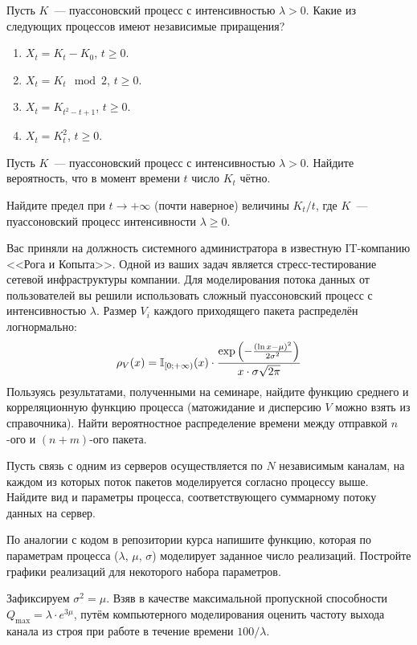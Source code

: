 \documentclass[12pt]{article}
\def\practice{\textbf{(практическое задание)}}
\begin{document}
\begin{exercise}
    Пусть $ K $~--- пуассоновский процесс с интенсивностью $ \lambda > 0 $.
    Какие из следующих процессов имеют независимые приращения?
    \begin{enumerate}
        \item $ X_t = K_t - K_0 $, $ t \geqslant 0 $.
        \item $ X_t = K_t \mod 2 $, $ t \geqslant 0 $.
        \item $ X_t = K_{t^2 - t + 1} $, $ t \geqslant 0 $.
        \item $ X_t = K_t^2 $, $ t \geqslant 0 $.
    \end{enumerate}
\end{exercise}


\begin{exercise}
    Пусть $ K $~--- пуассоновский процесс с интенсивностью $ \lambda > 0 $.
    Найдите вероятность, что в момент времени $ t $ число $ K_t $ чётно.
\end{exercise}


\begin{exercise}
    Найдите предел при $ t \to +\infty $ (почти наверное) величины $ K_t / t $,
    где $ K $~--- пуассоновский процесс интенсивности $ \lambda \geqslant 0 $.
\end{exercise}


\begin{exercise}[subtitle={\practice}]
    Вас приняли на должность системного администратора в известную IT-компанию <<Рога и Копыта>>.
    Одной из ваших задач является стресс-тестирование сетевой инфраструктуры компании.
    Для моделирования потока данных от пользователей вы решили использовать сложный пуассоновский процесс с интенсивностью $ \lambda $.
    Размер $ V_i $ каждого приходящего пакета распределён логнормально:
    \[
        \rho_{V}(x) = \mathbb{I}_{[0;+\infty)}(x) \cdot \frac{\exp\left(-\frac{(\ln x - \mu)^2}{2 \sigma^2}\right)}{x \cdot \sigma \sqrt{2 \pi}}
    \]
    Пользуясь результатами, полученными на семинаре, найдите функцию среднего и корреляционную функцию процесса
    (матожидание и дисперсию $ V $ можно взять из справочника).
    Найти вероятностное распределение времени между отправкой $ n $-ого и $ (n+m) $-ого пакета.

    Пусть связь с одним из серверов осуществляется по $ N $ независимым каналам,
    на каждом из которых поток пакетов моделируется согласно процессу выше.
    Найдите вид и параметры процесса, соответствующего суммарному потоку данных на сервер.

    По аналогии с кодом в репозитории курса напишите функцию,
    которая по параметрам процесса ($ \lambda $, $ \mu $, $ \sigma $) моделирует заданное число реализаций.
    Постройте графики реализаций для некоторого набора параметров.

    Зафиксируем $ \sigma^2 = \mu $.
    Взяв в качестве максимальной пропускной способности $ Q_{\text{max}} = \lambda \cdot e^{3 \mu} $,
    путём компьютерного моделирования оценить частоту выхода канала из строя при работе в течение времени $ 100 / \lambda $.
\end{exercise}
\end{document}
